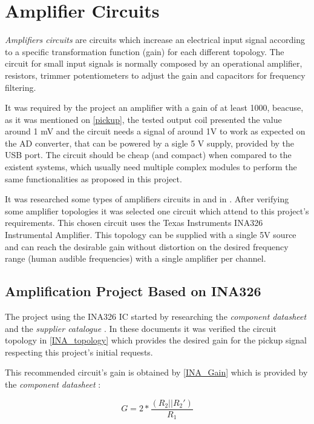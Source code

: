 \section{Amplifier Circuits}
\textit{Amplifiers circuits} \cite{amplifier-circuit} are circuits which increase
an electrical input signal according to a specific transformation function (gain)
for each different topology. The circuit for small input signals is normally
composed by an operational amplifier, resistors, trimmer potentiometers to adjust
the gain and capacitors for frequency filtering.

It was required by the project an amplifier with a gain of at least 1000, beacuse, as it was
mentioned on \autoref{pickup}, the tested output coil presented the value around 1 mV and the
circuit needs a signal of around 1V to work as expected on the AD converter, that can be powered by a sigle 5 V supply, provided by the USB port. The circuit
should be cheap (and compact) when compared to the existent systems, which usually need
multiple complex modules to perform the same functionalities as proposed in this project. 

It was researched some types of amplifiers circuits in 
and in . After verifying some amplifier topologies it was
selected one circuit which attend to this project's requirements.
This chosen circuit uses the Texas Instruments INA326 Instrumental Amplifier.%
This topology
can be supplied with a single 5V source and can reach the desirable gain without
distortion on the desired frequency range (human audible frequencies) with a single
amplifier per channel.


\subsection{Amplification Project Based on INA326}
The project using the INA326 IC started by researching the \textit{component datasheet}
\cite{INA326} and the \textit{supplier catalogue} \cite{OpAmps}. In these documents
it was verified the circuit topology in \autoref{INA_topology} which provides the
desired gain for the pickup signal respecting this project's initial requests.

This recommended circuit's gain is obtained by \autoref{INA_Gain} which is
provided by the \textit{component datasheet} \cite{INA326}:

\begin{equation}
  \label{INA_Gain}
  G=2*\frac{(R_2||R_2 ')}{R_1}
\end{equation}

